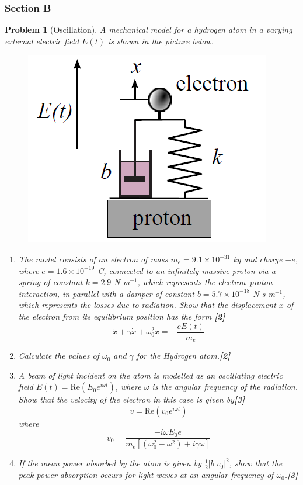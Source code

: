 \documentclass[a4paper]{article}
\theoremstyle{new}
\newtheorem{qns}{Problem}[subsection]
\begin{document}
\subsubsection{Section B}
\begin{qns}[Oscillation]
A mechanical model for a hydrogen atom in a varying external electric field $E(t)$ is shown in the picture below.
\begin{figure}[H]
    \centering
    \includegraphics[scale=0.5]{2011P1B6Q.PNG}
\end{figure}
\begin{enumerate}[label=(\roman*)]
\item The model consists of an electron of mass $m_e = 9.1\times 10^{−31}$ kg and charge $−e$, where $e = 1.6 × 10^{−19}$ C, connected to an infinitely massive proton via a spring of constant $k = 2.9$ N m$^{−1}$, which represents the electron–proton interaction, in parallel with a damper of constant $b = 5.7\times10^{-18}$ N s m$^{−1}$, which represents the losses due to radiation. Show that the displacement $x$ of the electron from its equilibrium position has the form \hfill\textbf{[2]}
$$\ddot{x}+\gamma\dot{x}+\omega_0^2x=-\frac{eE(t)}{m_e}$$
\item Calculate the values of $\omega_0$ and $\gamma$ for the Hydrogen atom.\hfill\textbf{[2]}
\item A beam of light incident on the atom is modelled as an oscillating electric field $E(t) = \text{Re}(E_0e^{i\omega t})$, where $\omega$ is the angular frequency of the radiation. Show that the velocity of the electron in this case is given by\hfill\textbf{[3]}
$$v=\text{Re}(v_0e^{i\omega t})$$
where
$$v_0=\frac{-i\omega E_0e}{m_e[(\omega_0^2-\omega^2)+i\gamma\omega]}$$
\item If the mean power absorbed by the atom is given by $\frac{1}{2}|b|v_0|^2$, show that the peak power absorption occurs for light waves at an angular frequency of $\omega_0$.\hfill\textbf{[3]}

\end{enumerate}
\end{qns}
\end{document}
